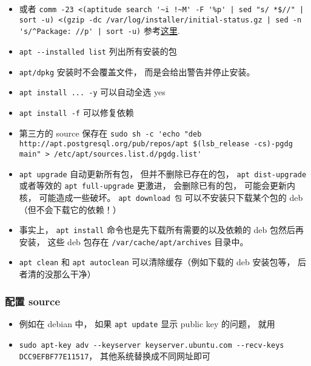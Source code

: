 \begin{itemize}
\item 或者 \verb`comm -23 <(aptitude search '~i !~M' -F '%p' | sed "s/ *$//" | sort -u) <(gzip -dc /var/log/installer/initial-status.gz | sed -n 's/^Package: //p' | sort -u)` 参考\href{https://askubuntu.com/questions/2389/how-to-list-manually-installed-packages}{这里}.
\item \verb|apt --installed list| 列出所有安装的包
\item \verb|apt/dpkg| 安装时不会覆盖文件， 而是会给出警告并停止安装。
\item \verb|apt install ... -y| 可以自动全选 yes
\item \verb|apt install -f| 可以修复依赖
\item 第三方的 source 保存在 \verb|sudo sh -c 'echo "deb http://apt.postgresql.org/pub/repos/apt $(lsb_release -cs)-pgdg main" > /etc/apt/sources.list.d/pgdg.list'|
\item \verb|apt upgrade| 自动更新所有包， 但并不删除已存在的包， \verb|apt dist-upgrade| 或者等效的 \verb|apt full-upgrade| 更激进， 会删除已有的包， 可能会更新内核， 可能造成一些破坏。
\verb|apt download 包| 可以不安装只下载某个包的 deb （但不会下载它的依赖！）
\item 事实上， \verb|apt install| 命令也是先下载所有需要的以及依赖的 deb 包然后再安装， 这些 deb 包存在 \verb|/var/cache/apt/archives| 目录中。
\item \verb|apt clean| 和 \verb|apt autoclean| 可以清除缓存（例如下载的 deb 安装包等， 后者清的没那么干净）
\end{itemize}


\subsubsection{配置 source}
\begin{itemize}
\item 例如在 debian 中， 如果 \verb|apt update| 显示 public key 的问题， 就用
\item \verb|sudo apt-key adv --keyserver keyserver.ubuntu.com --recv-keys DCC9EFBF77E11517|， 其他系统替换成不同网址即可
\end{itemize}

